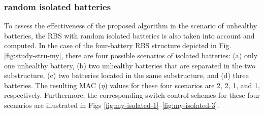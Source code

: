 \documentclass{article}
\begin{document}
\subsubsection{random isolated batteries}

To assess the effectiveness of the proposed algorithm in the scenario of unhealthy batteries, the RBS with random isolated batteries is also taken into account and computed. 
In the case of the four-battery RBS structure depicted in Fig. \ref{fig:study-stru-my}, there are four possible scenarios of isolated batteries: (a) only one unhealthy battery, (b) two unhealthy batteries that are separated in the two substructure, (c) two batteries located in the same substructure, and (d) three batteries. 
The resulting MAC ($\eta$) values for these four scenarios are 2, 2, 1, and 1, respectively.
Furthermore, the corresponding switch-control schemes for these four scenarios are illustrated in Figs \ref{fig:my-isolated-1}--\ref{fig:my-isolated-3}.
\end{document}
